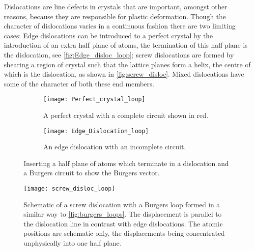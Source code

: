 

Dislocations are line defects in crystals that are important, amongst other reasons, because they are responsible for plastic deformation. Though the character of dislocations varies in a continuous fashion there are two limiting cases: Edge dislocations can be introduced to a perfect crystal by the introduction of an extra half plane of atoms, the termination of this half plane is the dislocation, see \autoref{fig:Edge_disloc_loop}; screw dislocations are formed by shearing a region of crystal such that the lattice planes form a helix, the centre of which is the dislocation, as shown in \autoref{fig:screw_disloc}. Mixed dislocations have some of the character of both these end members.



\begin{figure}
\centering

\begin{subfigure}{0.4\textwidth}
\centering
\texttt{[image: Perfect\_crystal\_loop]}
\caption{A perfect crystal with a complete circuit shown in red.}
\end{subfigure}
\begin{subfigure}{0.4\textwidth}
\centering
\texttt{[image: Edge\_Dislocation\_loop]}
\caption{An edge dislocation with an incomplete circuit. \label{fig:Edge_disloc_loop}}
\end{subfigure}

\caption[A Burgers loop around an edge dislocation.]{Inserting a half plane of atoms which terminate in a dislocation and a Burgers circuit to show the Burgers vector. \label{fig:burgers_loops}}

\end{figure}

\begin{figure}
\centering
{}
\texttt{[image: screw\_disloc\_loop]}
\caption[A Burgers loop around a screw dislocation.]{Schematic of a screw dislocation with a Burgers loop formed in a similar way to \autoref{fig:burgers_loops}. The displacement is parallel to the dislocation line in contrast with edge dislocations. The atomic positions are schematic only, the displacements being concentrated unphysically into one half plane. \label{fig:screw_disloc}}
\end{figure}




